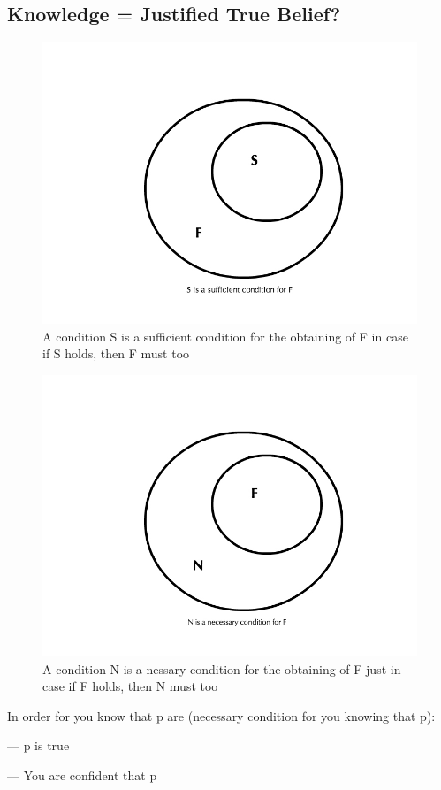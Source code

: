 \documentclass{book}
\begin{document}
\subsection{Knowledge = Justified True Belief?}

\begin{figure}[h]
\centering
\includegraphics[width=0.7\linewidth, height=0.4\textheight]{figures/SufficientCondition}
\caption{A condition S is a sufficient condition for the obtaining of F in case if S holds, then F must too}
\label{fig:sufficientcondition}
\end{figure}

\begin{figure}[h]
\centering
\includegraphics[width=0.7\linewidth, height=0.4\textheight]{figures/NecessaryCondition}
\caption{A condition N is a nessary condition for the obtaining of F just in case if F holds, then N must too}
\label{fig:necessarycondition}
\end{figure}


In order for you know that p are (necessary condition for you knowing that p):

--- p is true

--- You are confident that p
\end{document}

